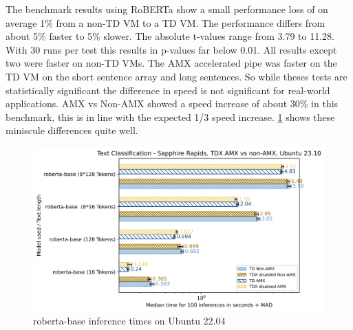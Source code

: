 The benchmark results using RoBERTa show a small performance loss of on average 1\% from a non-TD VM to a TD VM. The performance differs from about 5\% faster to 5\% slower. The absolute t-values range from 3.79 to 11.28. With 30 runs per test this results in p-values far below 0.01. All results except two were faster on non-TD VMs. The AMX accelerated pipe was faster on the TD VM on the short sentence array and long sentences. So while theses tests are statistically significant the difference in speed is not significant for real-world applications. AMX vs Non-AMX showed a speed increase of about 30\% in this benchmark, this is in line with the expected 1/3 speed increase.
\cref{fig:robertaUbuntu22.04} shows these miniscule differences quite well.
\begin{figure}
   \centering
       \includegraphics[width=.95\textwidth]{figures/Ubuntu22Roberta.png} 
 \caption{roberta-base inference times on Ubuntu 22.04}
 \label{fig:robertaUbuntu22.04}
\end{figure}


